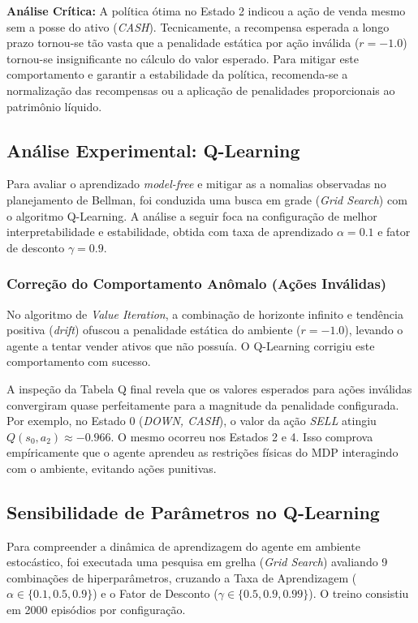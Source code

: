 \documentclass[12pt,a4paper]{article}
\begin{document}
\textbf{Análise Crítica:} A política ótima no Estado 2 indicou a ação de venda mesmo sem a posse do ativo
(\textit{CASH}). Tecnicamente, a recompensa esperada a longo prazo tornou-se tão vasta que a penalidade estática por
ação inválida ($r = -1.0$) tornou-se insignificante no cálculo do valor esperado.
Para mitigar este comportamento e garantir a estabilidade da política, recomenda-se a normalização das recompensas
ou a aplicação de penalidades proporcionais ao patrimônio líquido.

\subsection{Análise Experimental: Q-Learning}

Para avaliar o aprendizado \textit{model-free} e mitigar as a nomalias observadas no planejamento de Bellman,
foi conduzida uma busca em grade (\textit{Grid Search}) com o algoritmo Q-Learning. A análise a seguir
foca na configuração de melhor interpretabilidade e estabilidade, obtida com taxa de aprendizado
$\alpha = 0.1$ e fator de desconto $\gamma = 0.9$.

\subsubsection{Correção do Comportamento Anômalo (Ações Inválidas)}
No algoritmo de \textit{Value Iteration}, a combinação de horizonte infinito e tendência positiva (\textit{drift})
ofuscou a penalidade estática do ambiente ($r = -1.0$), levando o agente a tentar vender ativos que não possuía.
O Q-Learning corrigiu este comportamento com sucesso.

A inspeção da Tabela Q final revela que os valores esperados para ações inválidas convergiram quase perfeitamente
para a magnitude da penalidade configurada. Por exemplo, no Estado 0 (\textit{DOWN, CASH}), o valor da ação \textit{SELL}
atingiu $Q(s_0, a_2) \approx -0.966$. O mesmo ocorreu nos Estados 2 e 4. Isso comprova empíricamente que o agente
aprendeu as restrições físicas do MDP interagindo com o ambiente, evitando ações punitivas.

\subsection{Sensibilidade de Parâmetros no Q-Learning}

Para compreender a dinâmica de aprendizagem do agente em ambiente estocástico, foi executada uma pesquisa em grelha
(\textit{Grid Search}) avaliando 9 combinações de hiperparâmetros, cruzando a Taxa de Aprendizagem
($\alpha \in \{0.1, 0.5, 0.9\}$) e o Fator de Desconto ($\gamma \in \{0.5, 0.9, 0.99\}$). O treino consistiu em 2000 episódios
por configuração.
\end{document}
